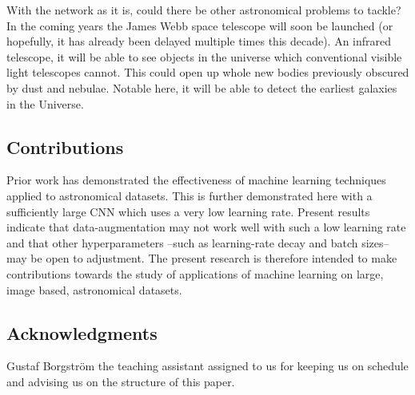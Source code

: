 With the network as it is, could there be other astronomical problems to tackle? In the coming years the James Webb space telescope will soon be launched (or hopefully, it has already been delayed multiple times this decade). An infrared telescope, it will be able to see objects in the universe which conventional visible light telescopes cannot. This could open up whole new bodies previously obscured by dust and nebulae. Notable here, it will be able to detect the earliest galaxies in the Universe.


\subsection{Contributions}
Prior work has demonstrated the effectiveness of machine learning techniques applied to astronomical datasets. This is further demonstrated here with a sufficiently large CNN which uses a very low learning rate. Present results indicate that data-augmentation may not work well with such a low learning rate and that other hyperparameters --such as learning-rate decay and batch sizes-- may be open to adjustment. The present research is therefore intended to make contributions towards the study of applications of machine learning on large, image based, astronomical datasets.


\subsection{Acknowledgments}

Gustaf Borgström the teaching assistant assigned to us for keeping us on schedule and advising us on the structure of this paper.
